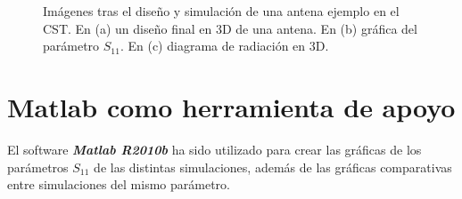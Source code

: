 \begin{figure}[!htb]
    \centering
    \caption{Imágenes tras el diseño y simulación de una antena ejemplo en el CST. En (a) un diseño final en 3D de una antena. En (b) gráfica del parámetro $S_{11}$. En (c) diagrama de radiación en 3D.}
    \label{fig:fig4.8}
\end{figure}

\clearpage


\section{Matlab como herramienta de apoyo}\label{sec:matlab-como-herramienta-de-apoyo}

El software \textbf{\textit{Matlab R2010b}} ha sido utilizado para crear las gráficas de los parámetros $S_{11}$ de las distintas simulaciones, además de las gráficas comparativas entre simulaciones del mismo parámetro.

